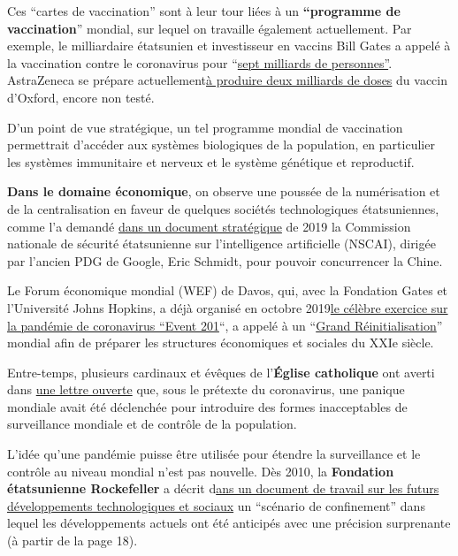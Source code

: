 Ces ``cartes de vaccination'' sont à leur tour liées à un
\textbf{``programme de vaccination}'' mondial, sur lequel on travaille
également actuellement. Par exemple, le milliardaire étatsunien et
investisseur en vaccins Bill Gates a appelé à la vaccination contre le
coronavirus pour
``\href{https://www.businessinsider.com/bill-gates-14-billion-doses-coronavirus-vaccine-may-be-needed-2020-5\%3Fop\%3D1\%26r\%3DUS\%26IR\%3DT}{sept
milliards de personnes''}. AstraZeneca se prépare
actuellement\href{https://www.sciencealert.com/2-billion-doses-of-oxford-s-potential-coronavirus-vaccine-could-soon-become-available}{à
produire deux milliards de doses} du vaccin d'Oxford, encore non testé.

D'un point de vue stratégique, un tel programme mondial de vaccination
permettrait d'accéder aux systèmes biologiques de la population, en
particulier les systèmes immunitaire et nerveux et le système génétique
et reproductif.

\textbf{Dans le domaine économique}, on observe une poussée de la
numérisation et de la centralisation en faveur de quelques sociétés
technologiques étatsuniennes, comme l'a demandé
\href{http://unlimitedhangout.com/2020/05/reports/techno-tyranny-how-the-us-national-security-state-is-using-coronavirus-to-fulfill-an-orwellian-vision/}{dans
un document stratégique} de 2019 la Commission nationale de sécurité
étatsunienne sur l'intelligence artificielle (NSCAI), dirigée par
l'ancien PDG de Google, Eric Schmidt, pour pouvoir concurrencer la
Chine.

Le Forum économique mondial (WEF) de Davos, qui, avec la Fondation Gates
et l'Université Johns Hopkins, a déjà organisé en octobre
2019\href{https://www.centerforhealthsecurity.org/event201/scenario.html}{le
célèbre exercice sur la pandémie de coronavirus ``Event 201}``, a appelé
à un ``\href{https://www.youtube.com/watch?v=u5pxhSnDr4U}{Grand
Réinitialisation}'' mondial afin de préparer les structures économiques
et sociales du XXIe siècle.

Entre-temps, plusieurs cardinaux et évêques de l'\textbf{Église
catholique} ont averti dans
\href{https://veritasliberabitvos.info/appeal/}{une lettre ouverte} que,
sous le prétexte du coronavirus, une panique mondiale avait été
déclenchée pour introduire des formes inacceptables de surveillance
mondiale et de contrôle de la population.

L'idée qu'une pandémie puisse être utilisée pour étendre la surveillance
et le contrôle au niveau mondial n'est pas nouvelle. Dès 2010, la
\textbf{Fondation étatsunienne Rockefeller} a décrit
d\href{https://swprs.files.wordpress.com/2020/04/rockefeller-foundation-scenarios-2010.pdf}{ans
un document de travail sur les futurs développements technologiques et
sociaux} un ``scénario de confinement'' dans lequel les développements
actuels ont été anticipés avec une précision surprenante (à partir de la
page 18).

